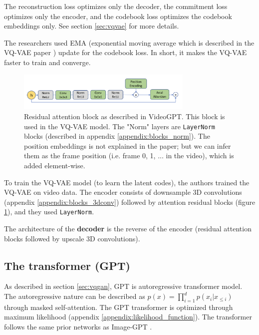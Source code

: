 The reconstruction loss optimizes only the decoder, the commitment loss optimizes only the encoder, and the codebook loss optimizes the codebook embeddings only. See section \ref{sec:vqvae} for more details.

The researchers used EMA (exponential moving average which is described in the VQ-VAE paper \cite{vqvae}) update for the codebook loss. In short, it makes the VQ-VAE faster to train and converge.

\begin{figure}
    \centering
    \includegraphics[width=0.75\textwidth]{images/video_gpt/res_atten_block.png}
    \caption{Residual attention block as described in VideoGPT. This block is used in the VQ-VAE model. The "Norm" layers are \texttt{LayerNorm} blocks (described in appendix \ref{appendix:blocks_norm}). The position embeddings is not explained in the paper; but we can infer them as the frame position (i.e. frame 0, 1, ... in the video), which is added element-wise.}
    \label{fig:videogpt_res_atten_block}
\end{figure}

To train the VQ-VAE model (to learn the latent codes), the authors trained the VQ-VAE on video data. The encoder consists of downsample 3D convolutions (appendix \ref{appendix:blocks_3dconv}) followed by attention residual blocks (figure \ref{fig:videogpt_res_atten_block}), and they used \texttt{LayerNorm}.

The architecture of the \textbf{decoder} is the reverse of the encoder (residual attention blocks followed by upscale 3D convolutions).

\subsection*{The transformer (GPT)}

As described in section \ref{sec:vqgan}, GPT is autoregressive transformer model. The autoregressive nature can be described as $p(x) = \prod_{i=1}^{d} p(x_i | x_{\leq i})$ through masked self-attention. The GPT transformer is optimized through maximum likelihood (appendix \ref{appendix:likelihood_function}). The transformer follows the same prior networks as Image-GPT \cite{imagegpt}.

